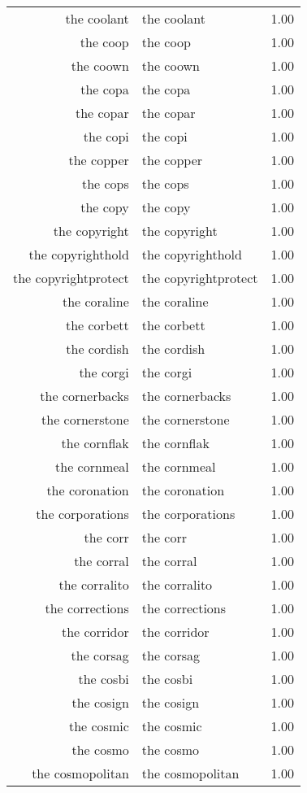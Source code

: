 \begin{table}[ht]
\begin{tabular}{rlr}
  the coolant & the coolant & 1.00 \\ 
  the coop & the coop & 1.00 \\ 
  the coown & the coown & 1.00 \\ 
  the copa & the copa & 1.00 \\ 
  the copar & the copar & 1.00 \\ 
  the copi & the copi & 1.00 \\ 
  the copper & the copper & 1.00 \\ 
  the cops & the cops & 1.00 \\ 
  the copy & the copy & 1.00 \\ 
  the copyright & the copyright & 1.00 \\ 
  the copyrighthold & the copyrighthold & 1.00 \\ 
  the copyrightprotect & the copyrightprotect & 1.00 \\ 
  the coraline & the coraline & 1.00 \\ 
  the corbett & the corbett & 1.00 \\ 
  the cordish & the cordish & 1.00 \\ 
  the corgi & the corgi & 1.00 \\ 
  the cornerbacks & the cornerbacks & 1.00 \\ 
  the cornerstone & the cornerstone & 1.00 \\ 
  the cornflak & the cornflak & 1.00 \\ 
  the cornmeal & the cornmeal & 1.00 \\ 
  the coronation & the coronation & 1.00 \\ 
  the corporations & the corporations & 1.00 \\ 
  the corr & the corr & 1.00 \\ 
  the corral & the corral & 1.00 \\ 
  the corralito & the corralito & 1.00 \\ 
  the corrections & the corrections & 1.00 \\ 
  the corridor & the corridor & 1.00 \\ 
  the corsag & the corsag & 1.00 \\ 
  the cosbi & the cosbi & 1.00 \\ 
  the cosign & the cosign & 1.00 \\ 
  the cosmic & the cosmic & 1.00 \\ 
  the cosmo & the cosmo & 1.00 \\ 
  the cosmopolitan & the cosmopolitan & 1.00 \\ 

\end{tabular}
\end{table}
